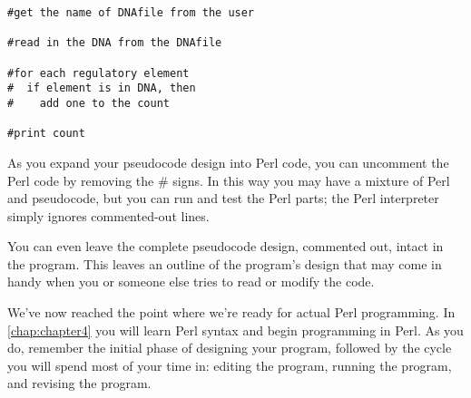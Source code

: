 \begin{lstlisting}
#get the name of DNAfile from the user

#read in the DNA from the DNAfile

#for each regulatory element
#  if element is in DNA, then
#    add one to the count

#print count
\end{lstlisting}

As you expand your pseudocode design into Perl code, you can uncomment the Perl code by removing the \# signs. In this way you may have a mixture of Perl and pseudocode, but you can run and test the Perl parts; the Perl interpreter simply ignores commented-out lines.

You can even leave the complete pseudocode design, commented out, intact in the program. This leaves an outline of the program's design that may come in handy when you or someone else tries to read or modify the code.

We've now reached the point where we're ready for actual Perl programming. In \autoref{chap:chapter4} you will learn Perl syntax and begin programming in Perl. As you do, remember the initial phase of designing your program, followed by the cycle you will spend most of your time in: editing the program, running the program, and revising the program. 
